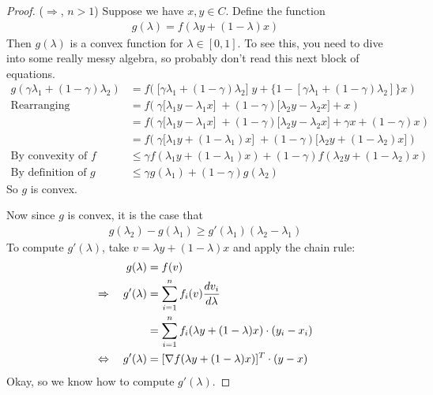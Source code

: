 \documentclass[12pt]{article}
\numberwithin{equation}{section} %
\theoremstyle{plain}
\theoremstyle{definition}
\theoremstyle{remark}
\newcommand{\sumin}{\sum^n_{i=1}}
\begin{document}
\begin{proof}
($\Rightarrow$, $n>1$)
Suppose we have $x,y\in C$. Define the function
\begin{align}
  g(\lambda) = f(\lambda y + (1-\lambda)x)
  \label{eq:gdef}
\end{align}
Then $g(\lambda)$ is a convex function for $\lambda\in [0,1]$.
To see this, you need to dive into some really messy algebra, so
probably don't read this next block of equations.
\begin{align*}
  g(\gamma \lambda_1 + (1-\gamma) \lambda_2)
  &=
  f\big(\; \big[\gamma \lambda_1 + (1-\gamma) \lambda_2\big] \; y
  + \big\{1 - [\gamma \lambda_1 + (1-\gamma) \lambda_2]\big\} x
  \;\big)\\
  \text{Rearranging} \qquad
  &=
  f\big(\;
  \gamma \big[\lambda_1 y - \lambda_1 x\big] \;
  +(1-\gamma)\big[ \lambda_2 y -\lambda_2 x \big]
  +  x
  \;\big)\\
  &=
  f\big(\;
  \gamma \big[\lambda_1 y - \lambda_1 x\big] \;
  +(1-\gamma)\big[ \lambda_2 y -\lambda_2 x \big]
  +  \gamma x + (1-\gamma) x
  \;\big)\\
  &=
  f\big(\;
  \gamma \big[\lambda_1 y + (1- \lambda_1 )x\big] \;
  +(1-\gamma)\big[ \lambda_2 y + (1-\lambda_2) x \big]
  \;\big)\\
  \text{By convexity of $f$}\qquad
  &\leq
  \gamma f(\lambda_1 y + (1- \lambda_1 )x)
  +(1-\gamma)f(\lambda_2 y + (1-\lambda_2) x)
  \\
  \text{By definition of $g$}\qquad
  &\leq
  \gamma g(\lambda_1)
  +(1-\gamma)g(\lambda_2)
\end{align*}
So $g$ is convex.

Now since $g$ is convex, it is the case that
\begin{align}
  g(\lambda_2) - g(\lambda_1)
  \geq g'(\lambda_1)(\lambda_2-\lambda_1)
  \label{ineq:glambda}
\end{align}
To compute $g'(\lambda)$, take $v=\lambda y + (1-\lambda) x$ and apply
the chain rule:
\begin{align}
  g(\lambda) &= f(v)\notag\\
  \Rightarrow\quad
  g'(\lambda)
  &= \sumin f_i(v) \frac{dv_i}{d\lambda}\notag \\
  &= \sumin f_i(\lambda y + (1-\lambda)x) \cdot (y_i-x_i) \notag\\
  \Leftrightarrow \quad
  g'(\lambda)
  &= [\nabla f(\lambda y + (1-\lambda)x)]^T\cdot (y-x)
  \label{eq:gprimelambda}
\end{align}
Okay, so we know how to compute $g'(\lambda)$.


\end{proof}
\end{document}
